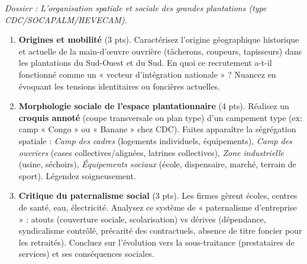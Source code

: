 \documentclass[11pt]{article}
\begin{document}
\begin{exercice}
\emph{Dossier : L'organisation spatiale et sociale des grandes plantations (type CDC/SOCAPALM/HEVECAM).}
\begin{enumerate}
\item \textbf{Origines et mobilité} (3 pts). Caractérisez l'origine géographique historique et actuelle de la main-d'œuvre ouvrière (tâcherons, coupeurs, tapisseurs) dans les plantations du Sud-Ouest et du Sud. En quoi ce recrutement a-t-il fonctionné comme un « vecteur d'intégration nationale » ? Nuancez en évoquant les tensions identitaires ou foncières actuelles.
\item \textbf{Morphologie sociale de l'espace plantationnaire} (4 pts). Réalisez un \textbf{croquis annoté} (coupe transversale ou plan type) d'un campement type (ex: camp « Congo » ou « Banane » chez CDC). Faites apparaître la ségrégation spatiale : \textit{Camp des cadres} (logements individuels, équipements), \textit{Camp des ouvriers} (cases collectives/alignées, latrines collectives), \textit{Zone industrielle} (usine, séchoirs), \textit{Équipements sociaux} (école, dispensaire, marché, terrain de sport). Légendez soigneusement.
\item \textbf{Critique du paternalisme social} (3 pts). Les firmes gèrent écoles, centres de santé, eau, électricité. Analysez ce système de « paternalisme d'entreprise » : atouts (couverture sociale, scolarisation) vs dérives (dépendance, syndicalisme contrôlé, précarité des contractuels, absence de titre foncier pour les retraités). Concluez sur l'évolution vers la sous-traitance (prestataires de services) et ses conséquences sociales.
\end{enumerate}
\end{exercice}
\end{document}

